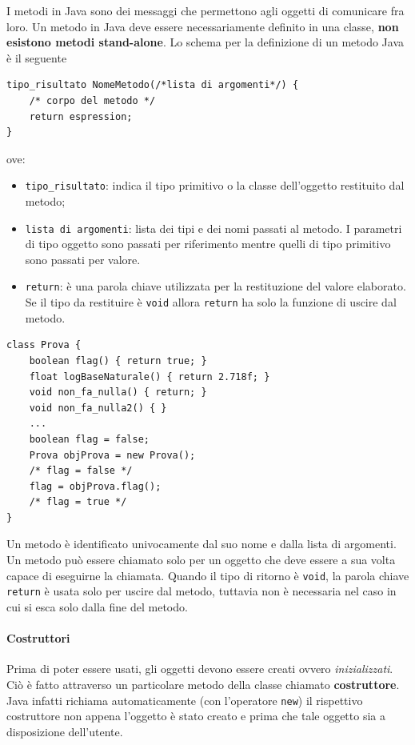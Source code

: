 \documentclass[12pt]{report}
\begin{document}
I metodi in Java sono dei messaggi che permettono agli oggetti di comunicare fra loro. Un metodo in Java deve essere necessariamente definito in una classe, \textbf{non esistono metodi stand-alone}. Lo schema per la definizione di un metodo Java è il seguente
\begin{lstlisting}[style=javastyle]
tipo_risultato NomeMetodo(/*lista di argomenti*/) {
	/* corpo del metodo */
	return espression;
}\end{lstlisting}
ove:
\begin{itemize}
	\item \texttt{tipo\_risultato}: indica il tipo primitivo o la classe dell'oggetto restituito dal metodo;
	\item \texttt{lista di argomenti}: lista dei tipi e dei nomi passati al metodo. I parametri di tipo oggetto sono passati per riferimento mentre quelli di tipo primitivo sono passati per valore.
	\item \texttt{return}: è una parola chiave utilizzata per la restituzione del valore elaborato. Se il tipo da restituire è \texttt{void} allora \texttt{return} ha solo la funzione di uscire dal metodo.
\end{itemize}
\begin{example}{}{}
\begin{lstlisting}[style=javastyle]
class Prova {
	boolean flag() { return true; }
	float logBaseNaturale() { return 2.718f; }
	void non_fa_nulla() { return; }
	void non_fa_nulla2() { }
	...
	boolean flag = false;
	Prova objProva = new Prova();
	/* flag = false */
	flag = objProva.flag();
	/* flag = true */
}
\end{lstlisting}
\end{example}
Un metodo è identificato univocamente dal suo nome e dalla lista di argomenti. Un metodo può essere chiamato solo per un oggetto che deve essere a sua volta capace di eseguirne la chiamata. Quando il tipo di ritorno è \texttt{void}, la parola chiave \texttt{return} è usata solo per uscire dal metodo, tuttavia non è necessaria nel caso in cui si esca solo dalla fine del metodo.

\paragraph{Costruttori} Prima di poter essere usati, gli oggetti devono essere creati ovvero \textit{inizializzati}. Ciò è fatto attraverso un particolare metodo della classe chiamato \textbf{costruttore}. Java infatti richiama automaticamente (con l'operatore \texttt{new}) il rispettivo costruttore non appena l'oggetto è stato creato e prima che tale oggetto sia a disposizione dell'utente.
\end{document}
